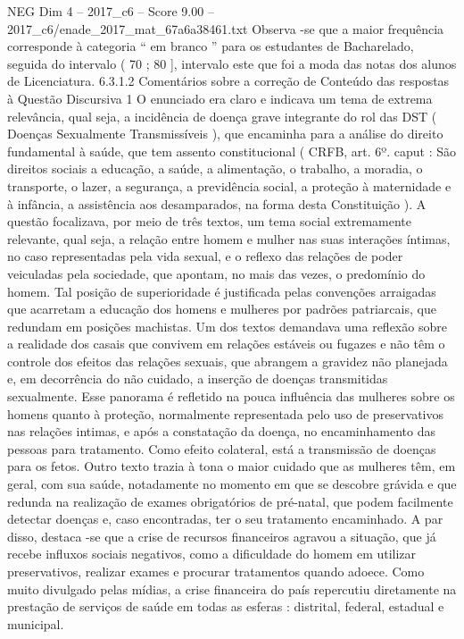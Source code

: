 \begin{textsample}{NEG Dim 4 – 2017\_c6 – Score 9.00 – 2017\_c6/enade\_2017\_mat\_67a6a38461.txt}
Observa -se que a maior frequência corresponde à categoria “ em branco ” para os estudantes de Bacharelado, seguida do intervalo ( 70 ; 80 ], intervalo este que foi a moda das notas dos alunos de Licenciatura. 6.3.1.2 Comentários sobre a correção de Conteúdo das respostas à Questão Discursiva 1 O enunciado era claro e indicava um tema de extrema relevância, qual seja, a incidência de doença grave integrante do rol das DST ( Doenças Sexualmente Transmissíveis ), que encaminha para a análise do direito fundamental à saúde, que tem assento constitucional ( CRFB, art. 6º. caput : São direitos sociais a educação, a saúde, a alimentação, o trabalho, a moradia, o transporte, o lazer, a segurança, a previdência social, a proteção à maternidade e à infância, a assistência aos desamparados, na forma desta Constituição ).
A questão focalizava, por meio de três textos, um tema social extremamente relevante, qual seja, a relação entre homem e mulher nas suas interações íntimas, no caso representadas pela vida sexual, e o reflexo das relações de poder veiculadas pela sociedade, que apontam, no mais das vezes, o predomínio do homem.
Tal posição de superioridade é justificada pelas convenções arraigadas que acarretam a educação dos homens e mulheres por padrões patriarcais, que redundam em posições machistas.
Um dos textos demandava uma reflexão sobre a realidade dos casais que convivem em relações estáveis ou fugazes e não têm o controle dos efeitos das relações sexuais, que abrangem a gravidez não planejada e, em decorrência do não cuidado, a inserção de doenças transmitidas sexualmente.
Esse panorama é refletido na pouca influência das mulheres sobre os homens quanto à proteção, normalmente representada pelo uso de preservativos nas relações intimas, e após a constatação da doença, no encaminhamento das pessoas para tratamento.
Como efeito colateral, está a transmissão de doenças para os fetos.
Outro texto trazia à tona o maior cuidado que as mulheres têm, em geral, com sua saúde, notadamente no momento em que se descobre grávida e que redunda na realização de exames obrigatórios de pré-natal, que podem facilmente detectar doenças e, caso encontradas, ter o seu tratamento encaminhado.
A par disso, destaca -se que a crise de recursos financeiros agravou a situação, que já recebe influxos sociais negativos, como a dificuldade do homem em utilizar preservativos, realizar exames e procurar tratamentos quando adoece.
Como muito divulgado pelas mídias, a crise financeira do país repercutiu diretamente na prestação de serviços de saúde em todas as esferas : distrital, federal, estadual e municipal.

\end{textsample}
